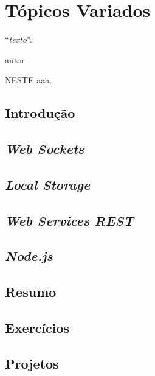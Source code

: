 \chapter{Tópicos Variados}
\epigraph{``\textit{texto}''.}{autor}

\lettrine[lines=4, lhang=0.1, lraise=0, loversize=0.2, findent=0.1em]{\textcolor{corAzulTema}{N}}{ESTE} aaa.

\section{Introdução}

\section{\textit{Web Sockets}}

\section{\textit{Local Storage}}

\section{\textit{Web Services REST}}

\section{\textit{Node.js}}

\section{Resumo}

\section{Exercícios}

\section{Projetos}
